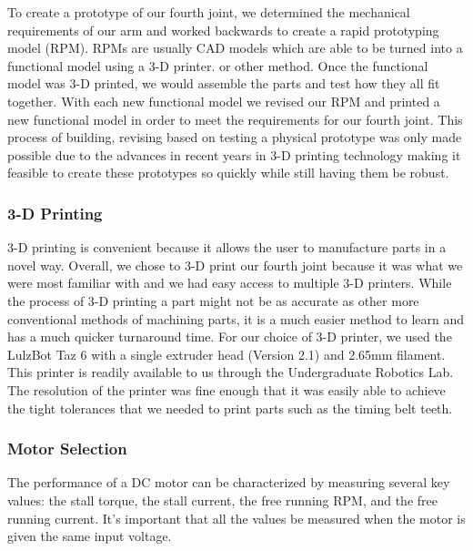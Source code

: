 \noindent To create a prototype of our fourth joint, we determined the mechanical requirements of our arm and worked backwards to create a rapid prototyping model (RPM).  RPMs are usually CAD models which are able to be turned into a functional model using a 3-D printer. or other method.  Once the functional model was 3-D printed, we would assemble the parts and test how they all fit together.  With each new functional model we revised our RPM and printed a new functional model in order to meet the requirements for our fourth joint. This process of building, revising based on testing a physical prototype was only made possible due to the advances in recent years in 3-D printing technology making it feasible to create these prototypes so quickly while still having them be robust. 


\subsubsection{3-D Printing}
3-D printing is convenient because it allows the user to manufacture parts in a novel way. Overall, we chose to 3-D print our fourth joint because it was what we were most familiar with and we had easy access to multiple 3-D printers.  While the process of 3-D printing a part might not be as accurate as other more conventional methods of machining parts, it is a much easier method to learn and has a much quicker turnaround time. For our choice of 3-D printer, we used the LulzBot Taz 6 \cite{Taz6} with a single extruder head (Version 2.1) and 2.65mm filament. This printer is readily available to us through the Undergraduate Robotics Lab. The resolution of the printer was fine enough that it was easily able to achieve the tight tolerances that we needed to print parts such as the timing belt teeth.  


\subsubsection{Motor Selection}

The performance of a DC motor can be characterized by measuring several key values: the stall torque, the stall current, the free running RPM, and the free running current. It's important that all the values be measured when the motor is given the same input voltage.\\

